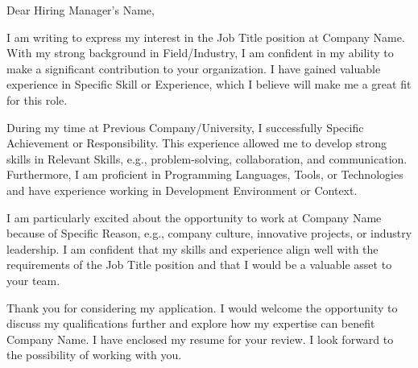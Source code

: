 \documentclass[a4paper,12pt]{article} %
\begin{document}
\thispagestyle{empty}

\vspace{12pt}
\vspace{12pt}

\begin{center}
    Dear Hiring Manager's Name,
\end{center}

\vspace{12pt}
\vspace{12pt}

I am writing to express my interest in the Job Title position at Company Name. With my strong background in Field/Industry, I am confident in my ability to make a significant contribution to your organization. I have gained valuable experience in Specific Skill or Experience, which I believe will make me a great fit for this role.

\vspace{12pt}

During my time at Previous Company/University, I successfully Specific Achievement or Responsibility. This experience allowed me to develop strong skills in Relevant Skills, e.g., problem-solving, collaboration, and communication. Furthermore, I am proficient in Programming Languages, Tools, or Technologies and have experience working in Development Environment or Context.

\vspace{12pt}

I am particularly excited about the opportunity to work at Company Name because of Specific Reason, e.g., company culture, innovative projects, or industry leadership. I am confident that my skills and experience align well with the requirements of the Job Title position and that I would be a valuable asset to your team.

\vspace{12pt}

Thank you for considering my application. I would welcome the opportunity to discuss my qualifications further and explore how my expertise can benefit Company Name. I have enclosed my resume for your review. I look forward to the possibility of working with you.

\vspace{12pt}

\vspace*{\fill}
\end{document}
